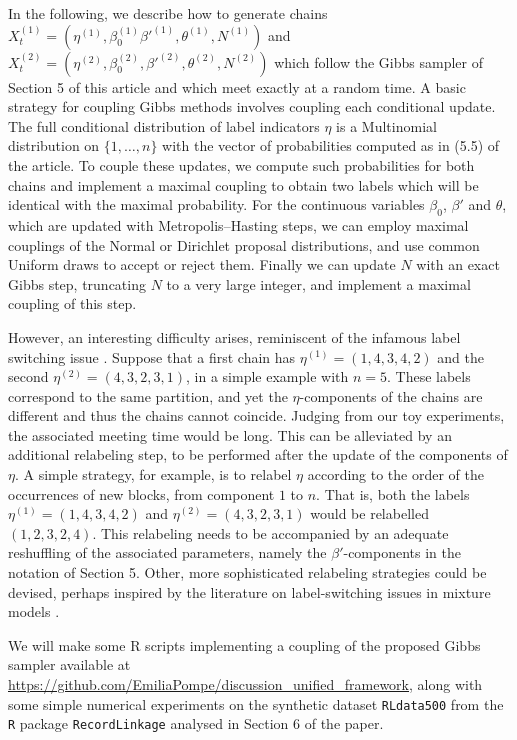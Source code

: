 \documentclass[ba]{imsart}
\begin{document}
In the following, we describe how to generate chains
${X_t^{(1)}=(\eta^{(1)},  \beta_0^{(1)}
\beta'^{(1)}, \theta^{(1)},N^{(1)})}$ and 
$X_t^{(2)}=(\eta^{(2)},  \beta_0^{(2)},
\beta'^{(2)},\theta^{(2)},N^{(2)})$ which follow the Gibbs sampler of Section 5 of this article and which meet exactly at a random time.
A basic strategy for coupling Gibbs methods involves coupling each conditional update. The full conditional distribution of label indicators $\eta$ is a Multinomial distribution on $\{1,\ldots,n\}$ with the vector of probabilities computed as in (5.5) of the article.
To couple these updates, we compute such probabilities for both chains
and implement a maximal coupling to obtain two labels which will be identical with the maximal probability.
For the continuous variables $\beta_0$, $\beta'$ and $\theta$,
which are updated with Metropolis--Hasting steps,
we can employ maximal couplings of the Normal or Dirichlet proposal distributions, and use common Uniform draws to accept
or reject them.
Finally we can update $N$ with an exact Gibbs step, truncating $N$ to a very large integer, and implement a maximal coupling of this step.


However, an interesting difficulty
arises, reminiscent of the infamous label switching
issue \citep{stephens2000dealing}. Suppose that a first chain
has $\eta^{(1)} = (1,4,3,4,2)$ and the second $\eta^{(2)} = (4,3,2,3,1)$,
in a simple example with $n=5$.
These labels correspond to the same partition, 
and yet the $\eta$-components of the chains
are different and thus the chains cannot coincide.
Judging from our toy experiments, the associated meeting time
would be long.
This can be alleviated by an 
additional relabeling step, to be performed
after the update of the components of $\eta$.
A simple strategy, for example, is to relabel $\eta$ according to the order of the occurrences of new blocks, from component $1$ to $n$.
That is, both the labels $\eta^{(1)} = (1,4,3,4,2)$ 
and $\eta^{(2)} = (4,3,2,3,1)$  would
be relabelled $(1,2,3,2,4)$. 
This relabeling needs to be accompanied
by an adequate reshuffling of the associated
parameters, namely the $\beta'$-components in the notation of Section 5.
Other, more sophisticated relabeling strategies could
be devised, perhaps inspired by 
the literature on label-switching issues
in mixture models \citep{stephens2000dealing,marin2005bayesian,fruhwirth2011label}.

We will make some R scripts implementing a coupling of the proposed Gibbs sampler available at
\url{https://github.com/EmiliaPompe/discussion_unified_framework},
along with some simple numerical experiments on the synthetic dataset \texttt{RLdata500} from the \texttt{R} package \texttt{RecordLinkage} analysed in Section 6 of the paper.




\end{document}
